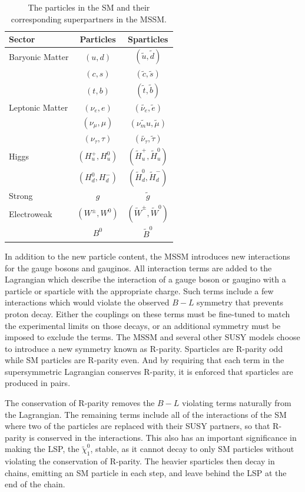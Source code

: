 \begin{table}
\centering
\begin{tabular}{lcc}
\hline
Sector & Particles & Sparticles \\
\hline
Baryonic Matter & $(u,d)$ & $(\tilde{u},\tilde{d})$ \\
                & $(c,s)$ & $(\tilde{c},\tilde{s})$ \\
                & $(t,b)$ & $(\tilde{t},\tilde{b})$ \\
Leptonic Matter & $(\nu_e,e)$ & $(\tilde{\nu_e},\tilde{e})$ \\
                & $(\nu_\mu,\mu)$ & $(\tilde{\nu_mu},\tilde{\mu})$ \\
                & $(\nu_\tau,\tau)$ & $(\tilde{\nu_\tau},\tilde{\tau})$ \\
Higgs           & $(H_u^+, H_u^0)$ & $(\tilde{H}_u^+, \tilde{H}_u^0)$ \\
                & $(H_d^0, H_d^-)$ & $(\tilde{H}_d^0, \tilde{H}_d^-)$ \\
Strong          & $g$ & $\tilde{g}$ \\
Electroweak     & $(W^\pm, W^0)$ & $(\tilde{W}^\pm, \tilde{W}^0)$ \\
                & $B^0$ & $\tilde{B}^0$ \\
\end{tabular}
\caption{The particles in the \ac{SM} and their corresponding superpartners in the \ac{MSSM}.}
\label{tab:sparticles}
\end{table}


In addition to the new particle content, the \ac{MSSM} introduces new interactions for the gauge bosons and gauginos.
All interaction terms are added to the Lagrangian which describe the interaction of a gauge boson or gaugino with a particle or sparticle with the appropriate charge.
Such terms include a few interactions which would violate the observed $B - L$ symmetry that prevents proton decay.
Either the couplings on these terms must be fine-tuned to match the experimental limits on those decays, or an additional symmetry must be imposed to exclude the terms.
The \ac{MSSM} and several other \ac{SUSY} models choose to introduce a new symmetry known as R-parity.
Sparticles are R-parity odd while \ac{SM} particles are R-parity even.
And by requiring that each term in the supersymmetric Lagrangian conserves R-parity, it is enforced that sparticles are produced in pairs.

The conservation of R-parity removes the $B-L$ violating terms naturally from the Lagrangian.
The remaining terms include all of the interactions of the \ac{SM} where two of the particles are replaced with their \ac{SUSY} partners, so that R-parity is conserved in the interactions.
This also has an important significance in making the \ac{LSP}, the $\tilde{\chi}_1^0$, stable, as it cannot decay to only \ac{SM} particles without violating the conservation of R-parity.
The heavier sparticles then decay in chains, emitting an \ac{SM} particle in each step, and leave behind the \ac{LSP} at the end of the chain.

